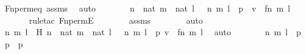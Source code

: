 \begin{isabellebody}
\ Fn{\isacharunderscore}{\kern0pt}perm{\isacharprime}{\kern0pt}{\isacharunderscore}{\kern0pt}eq\ assms\ \isamarkupfalse%
\ auto\isanewline
\ \ \ \ \isamarkupfalse%
\ \isamarkupfalse%
\ {\isachardoublequoteopen}{\isasymexists}n\ {\isasymin}\ nat{\isachardot}{\kern0pt}\ {\isasymexists}m\ {\isasymin}\ nat{\isachardot}{\kern0pt}\ {\isasymexists}l\ {\isasymin}\ {}{\isachardot}{\kern0pt}\ {\isacharless}{\kern0pt}{\isacharless}{\kern0pt}n{\isacharcomma}{\kern0pt}\ m{\isachargreater}{\kern0pt}{\isacharcomma}{\kern0pt}\ l{\isachargreater}{\kern0pt}\ {\isasymin}\ p{\isacharprime}{\kern0pt}\ {\isasymand}\ v\ {\isacharequal}{\kern0pt}\ {\isacharless}{\kern0pt}{\isacharless}{\kern0pt}f{\isacharbackquote}{\kern0pt}n{\isacharcomma}{\kern0pt}\ m{\isachargreater}{\kern0pt}{\isacharcomma}{\kern0pt}\ l{\isachargreater}{\kern0pt}{\isachardoublequoteclose}\ \isanewline
\ \ \ \ \ \ \isamarkupfalse%
{\isacharparenleft}{\kern0pt}rule{\isacharunderscore}{\kern0pt}tac\ Fn{\isacharunderscore}{\kern0pt}permE{\isacharparenright}{\kern0pt}\isanewline
\ \ \ \ \ \ \isamarkupfalse%
\ assms\isanewline
\ \ \ \ \ \ \isamarkupfalse%
\ auto\isanewline
\ \ \ \ \isamarkupfalse%
\ \isamarkupfalse%
\ n\ m\ l\ \ H{\isacharcolon}{\kern0pt}\ {\isachardoublequoteopen}n\ {\isasymin}\ nat{\isachardoublequoteclose}\ {\isachardoublequoteopen}m\ {\isasymin}\ nat{\isachardoublequoteclose}\ {\isachardoublequoteopen}l\ {\isasymin}\ {}{\isachardoublequoteclose}\ {\isachardoublequoteopen}{\isacharless}{\kern0pt}{\isacharless}{\kern0pt}n{\isacharcomma}{\kern0pt}\ m{\isachargreater}{\kern0pt}{\isacharcomma}{\kern0pt}\ l{\isachargreater}{\kern0pt}\ {\isasymin}\ p{\isacharprime}{\kern0pt}{\isachardoublequoteclose}\ {\isachardoublequoteopen}v\ {\isacharequal}{\kern0pt}\ {\isacharless}{\kern0pt}{\isacharless}{\kern0pt}f{\isacharbackquote}{\kern0pt}n{\isacharcomma}{\kern0pt}\ m{\isachargreater}{\kern0pt}{\isacharcomma}{\kern0pt}\ l{\isachargreater}{\kern0pt}{\isachardoublequoteclose}\ \isamarkupfalse%
\ auto\isanewline
\ \ \ \ \isamarkupfalse%
\ \isamarkupfalse%
\ {\isachardoublequoteopen}{\isacharless}{\kern0pt}{\isacharless}{\kern0pt}n{\isacharcomma}{\kern0pt}\ m{\isachargreater}{\kern0pt}{\isacharcomma}{\kern0pt}\ l{\isachargreater}{\kern0pt}\ {\isasymin}\ p{\isachardoublequoteclose}\ \isamarkupfalse%
\ {\isacartoucheopen}p{\isacharprime}{\kern0pt}\ {\isasymsubseteq}\ p{\isacartoucheclose}\ \isamarkupfalse%

\end{isabellebody}
